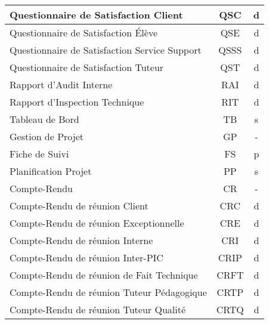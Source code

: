\begin{longtable}{|p{12cm}|c|c|}
    \hline
    \hspace{2cm} Questionnaire de Satisfaction Client & QSC & d\\
    \hline
    \hspace{2cm} Questionnaire de Satisfaction Élève & QSE & d\\
    \hline
    \hspace{2cm} Questionnaire de Satisfaction Service Support & QSSS & d\\
    \hline
    \hspace{2cm} Questionnaire de Satisfaction Tuteur & QST & d\\    
    \hline
    \hspace{1cm} Rapport d'Audit Interne & RAI & d\\  
    \hline
    \hspace{1cm} Rapport d'Inspection Technique & RIT & d\\
    \hline
    \hspace{1cm} Tableau de Bord & TB & s\\
    \hline
    Gestion de Projet & GP & -\\
    \hline
    \hspace{1cm} Fiche de Suivi & FS & p\\
    \hline
    \hspace{1cm} Planification Projet & PP & s\\    
    \hline
    \hspace{1cm} Compte-Rendu & CR & -\\
    \hline
    \hspace{2cm} Compte-Rendu de réunion Client & CRC & d\\
    \hline
    \hspace{2cm} Compte-Rendu de réunion Exceptionnelle & CRE & d\\
    \hline
    \hspace{2cm} Compte-Rendu de réunion Interne & CRI & d\\
    \hline
    \hspace{2cm} Compte-Rendu de réunion Inter-PIC & CRIP & d\\
    \hline
    \hspace{2cm} Compte-Rendu de réunion de Fait Technique & CRFT & d\\
    \hline
    \hspace{2cm} Compte-Rendu de réunion Tuteur Pédagogique & CRTP & d\\
    \hline
    \hspace{2cm} Compte-Rendu de réunion Tuteur Qualité & CRTQ & d\\

\end{longtable}
